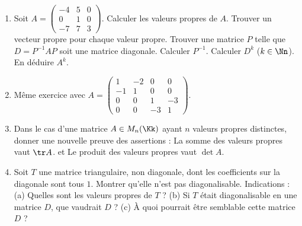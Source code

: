 \documentclass[11pt, class=report,crop=false]{standalone}
\begin{document}
\begin{miniexercices}
\sauteligne
\begin{enumerate}
  \item 
  Soit $A=\left(\begin{smallmatrix}
-4 & 5 & 0 \\
0 & 1 & 0 \\
-7 & 7 & 3  
\end{smallmatrix}\right)$. Calculer les valeurs propres de $A$. Trouver un vecteur propre pour chaque valeur propre. Trouver une matrice $P$ telle que $D = P^{-1} A P$ soit une matrice diagonale. Calculer $P^{-1}$. Calculer $D^k$ ($k\in\Nn$). En déduire $A^k$.
  
  \item Même exercice avec $A = \left(\begin{smallmatrix}
  1 & -2 & 0 & 0 \\
-1 & 1 & 0 & 0 \\
0 & 0 & 1 & -3 \\
0 & 0 & -3 & 1
 \end{smallmatrix}\right)$.
 
  \item Dans le cas d'une matrice $A \in M_n(\Kk)$ ayant $n$ valeurs propres distinctes, donner une nouvelle preuve des assertions : \og{}La somme des valeurs propres vaut $\tr A$.\fg{}
  et \og{}Le produit des valeurs propres vaut $\det A$.\fg{}
  
  \item Soit $T$ une matrice triangulaire, non diagonale, dont les coefficients sur la diagonale sont tous $1$. Montrer qu'elle n'est pas diagonalisable. Indications : (a) Quelles sont les valeurs propres de $T$ ? (b) Si $T$ était diagonalisable en une matrice $D$, que vaudrait $D$ ? (c) \`A quoi pourrait être semblable cette matrice $D$ ? 
\end{enumerate}
\end{miniexercices}





\finchapitre 
\end{document}
